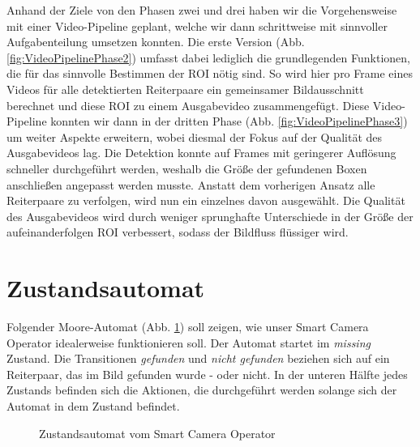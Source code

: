 Anhand der Ziele von den Phasen zwei und drei haben wir die Vorgehensweise mit einer Video-Pipeline geplant, welche wir dann schrittweise mit sinnvoller Aufgabenteilung umsetzen konnten. Die erste Version (Abb. \ref{fig:VideoPipelinePhase2}) umfasst dabei lediglich die grundlegenden Funktionen, die für das sinnvolle Bestimmen der ROI nötig sind. So wird hier pro Frame eines Videos für alle detektierten Reiterpaare ein gemeinsamer Bildausschnitt berechnet und diese ROI zu einem Ausgabevideo zusammengefügt.
Diese Video-Pipeline konnten wir dann in der dritten Phase (Abb. \ref{fig:VideoPipelinePhase3}) um weiter Aspekte erweitern, wobei diesmal der Fokus auf der Qualität des Ausgabevideos lag. Die Detektion konnte auf Frames mit geringerer Auflösung schneller durchgeführt werden, weshalb die Größe der gefundenen Boxen anschließen angepasst werden musste. Anstatt dem vorherigen Ansatz alle Reiterpaare zu verfolgen, wird nun ein einzelnes davon ausgewählt. Die Qualität des Ausgabevideos wird durch weniger sprunghafte Unterschiede in der Größe der aufeinanderfolgen ROI verbessert, sodass der Bildfluss flüssiger wird.

\section{Zustandsautomat}

Folgender Moore-Automat (Abb. \ref{fig:MoorAutomat}) soll zeigen, wie unser Smart Camera Operator idealerweise funktionieren soll.
Der Automat startet im \emph{missing} Zustand.
Die Transitionen \emph{gefunden} und \emph{nicht gefunden} beziehen sich auf ein Reiterpaar, das im Bild gefunden wurde - oder nicht.
In der unteren Hälfte jedes Zustands befinden sich die Aktionen, die durchgeführt werden solange sich der Automat in dem Zustand befindet.

\begin{figure}[h]
\centering
{}
\caption{Zustandsautomat vom Smart Camera Operator}
\label{fig:MoorAutomat}
\end{figure}
